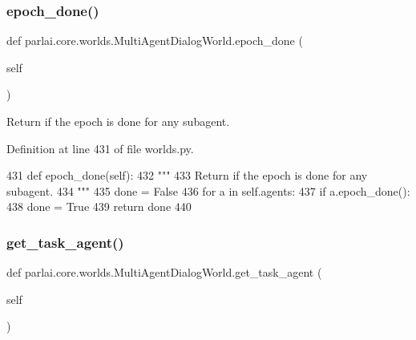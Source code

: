 \subsubsection{\texorpdfstring{epoch\+\_\+done()}{epoch\_done()}}
{\footnotesize\ttfamily def parlai.\+core.\+worlds.\+Multi\+Agent\+Dialog\+World.\+epoch\+\_\+done (\begin{DoxyParamCaption}\item[{}]{self }\end{DoxyParamCaption})}

\begin{DoxyVerb}Return if the epoch is done for any subagent.
\end{DoxyVerb}
 

Definition at line 431 of file worlds.\+py.


\begin{DoxyCode}
431     \textcolor{keyword}{def }epoch\_done(self):
432         \textcolor{stringliteral}{"""}
433 \textcolor{stringliteral}{        Return if the epoch is done for any subagent.}
434 \textcolor{stringliteral}{        """}
435         done = \textcolor{keyword}{False}
436         \textcolor{keywordflow}{for} a \textcolor{keywordflow}{in} self.agents:
437             \textcolor{keywordflow}{if} a.epoch\_done():
438                 done = \textcolor{keyword}{True}
439         \textcolor{keywordflow}{return} done
440 
\end{DoxyCode}
\mbox{\label{classparlai_1_1core_1_1worlds_1_1MultiAgentDialogWorld_a58ea065f63c441f27c97b6cb649ccf53}} 
\subsubsection{\texorpdfstring{get\+\_\+task\+\_\+agent()}{get\_task\_agent()}}
{\footnotesize\ttfamily def parlai.\+core.\+worlds.\+Multi\+Agent\+Dialog\+World.\+get\+\_\+task\+\_\+agent (\begin{DoxyParamCaption}\item[{}]{self }\end{DoxyParamCaption})}

